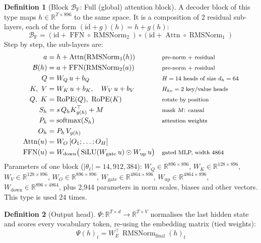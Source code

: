 \documentclass[10pt,a4paper]{article}
\newcommand{\op}[1]{\operatorname{#1}}
\theoremstyle{definition}
\newtheorem{definition}{Definition}[section]
\begin{document}
\begin{definition}[Block $\mathcal{B}_{\mathrm{F}}$: Full (global) attention block]
A decoder block of this type maps $h\in\mathbb{R}^{T\times 896}$ to the same space. It is a composition of 2 residual sub-layers, each of the form $(\mathrm{id}+g)(h)=h+g(h)$:
\begin{equation}
  \mathcal{B}_{\mathrm{F}} = (\mathrm{id}+\op{FFN}\circ \op{RMSNorm}_{2})\circ(\mathrm{id}+\op{Attn}\circ \op{RMSNorm}_{1})
\end{equation}
Step by step, the sub-layers are:
\begin{align*}
  a &= h + \op{Attn}(\op{RMSNorm}_{1}(h)) && \text{\footnotesize pre-norm + residual} \\
  \mathcal{B}(h) &= a + \op{FFN}(\op{RMSNorm}_{2}(a)) && \text{\footnotesize pre-norm + residual} \\
  Q &= W_Q\,u + b_{Q} && \text{\footnotesize $H=14$ heads of size $d_h=64$} \\
  K,\ V &= W_K\,u + b_{K},\quad W_V\,u + b_{V} && \text{\footnotesize $H_{kv}=2$ key/value heads} \\
  Q,\ K &= \op{RoPE}(Q),\ \op{RoPE}(K) && \text{\footnotesize rotate by position} \\
  S_h &= s\, Q_h K_{g(h)}^{\top} + M && \text{\footnotesize mask $M$: causal} \\
  P_h &= \op{softmax}(S_h) && \text{\footnotesize attention weights} \\
  O_h &= P_h\, V_{g(h)} \\
  \op{Attn}(u) &= W_O\,[O_1;\dots;O_H] \\
  \op{FFN}(u) &= W_{\mathrm{down}}\big(\op{SiLU}(W_{\mathrm{gate}}\,u)\odot W_{\mathrm{up}}\,u\big) && \text{\footnotesize gated MLP, width 4864}
\end{align*}
Parameters of one block ($|\theta_\ell|=14{,}912{,}384$): $W_Q\in\mathbb{R}^{896\times896}$, $W_K\in\mathbb{R}^{128\times896}$, $W_V\in\mathbb{R}^{128\times896}$, $W_O\in\mathbb{R}^{896\times896}$, $W_{\mathrm{gate}}\in\mathbb{R}^{4864\times896}$, $W_{\mathrm{up}}\in\mathbb{R}^{4864\times896}$, $W_{\mathrm{down}}\in\mathbb{R}^{896\times4864}$, plus 2,944 parameters in norm scales, biases and other vectors. This type is used 24 times.
\end{definition}
\begin{definition}[Output head]
$\Psi:\mathbb{R}^{T\times d}\to\mathbb{R}^{T\times V}$ normalises the last hidden state and scores every vocabulary token, re-using the embedding matrix (tied weights):
\begin{equation}
  \Psi(h)_t = W_E^{\top}\,\op{RMSNorm}_{\mathrm{final}}(h)_t
\end{equation}
\end{definition}
\end{document}
